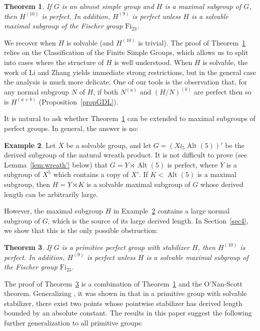\documentclass[11pt]{amsart}
\numberwithin{equation}{section}
\newtheorem{theorem}{Theorem}[section]
\theoremstyle{definition}
\newtheorem{example}[theorem]{Example}
\theoremstyle{remark}
\newcommand{\Alt}{\mathop{\mathrm{Alt}}}
\begin{document}
\begin{theorem} \label{thMain}
If $G$ is an almost simple group and $H$ is a maximal subgroup of $G$,
then $H^{(10)}$ is perfect.
In addition, $H^{(9)}$ is perfect unless $H$ is a solvable maximal subgroup of the Fischer group $\mathrm{Fi}_{23}$.
\end{theorem}

We recover \cite[Th.~1.4]{Sab26} when $H$ is solvable (and $H^{(10)}$ is trivial).
The proof of Theorem~\ref{thMain} relies on the Classification of the Finite Simple Groups, which allows us to split into cases where the structure of $H$ is well understood.
When $H$ is solvable, the work of Li and Zhang \cite{LZ11} yields immediate strong restrictions, but in the general case the analysis is much more delicate.
One of our tools is the observation that, for any normal subgroup $N$ of $H$, if both $N^{(a)}$ and $(H/N)^{(b)}$ are perfect then so is $H^{(a+b)}$ (Proposition~\ref{propGDL}).

It is natural to ask whether Theorem~\ref{thMain} can be extended to maximal subgroups of perfect groups. In general, the answer is no:

\begin{example} \label{exBad}
Let $X$ be a solvable group,
and let $G = (X \wr_5 \Alt(5))'$ be the derived subgroup of the natural wreath product.
It is not difficult to prove (see Lemma~\ref{lem:wreath'} below) that $G = Y \rtimes \Alt(5)$ is perfect,
where $Y$ is a subgroup of $X^5$ which contains a copy of $X'$.
If $K < \Alt(5)$ is a maximal subgroup,
then $H= Y \rtimes K$ is a solvable maximal subgroup of $G$ whose derived length can be arbitrarily large.
\end{example}

However, the maximal subgroup $H$ in Example~\ref{exBad} contains a large normal subgroup of $G$, which is the source of its large derived length.
In Section~\ref{sec4}, we show that this is the only possible obstruction:

\begin{theorem} \label{thPrimPerf}
If $G$ is a primitive perfect group with stabilizer $H$, then $H^{(10)}$ is perfect.
In addition, $H^{(9)}$ is perfect unless $H$ is a solvable maximal subgroup of the Fischer group $\mathrm{Fi}_{23}$.
\end{theorem} 

The proof of Theorem~\ref{thPrimPerf} is a combination of Theorem~\ref{thMain} and the O'Nan-Scott theorem.
Generalizing \cite{LS25},
it was shown in \cite[Th.~1.5]{Sab26} that in a primitive group with solvable stabilizer, there exist two points whose pointwise stabilizer has derived length bounded by an absolute constant.
The results in this paper suggest the following further generalization to all primitive groups:
\end{document}
